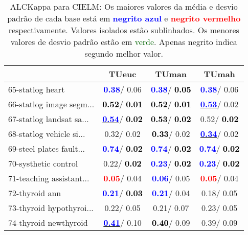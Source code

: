 \begin{table}[h]
\caption{ALCKappa para CIELM: Os maiores valores da média e desvio padrão de cada base está em \textcolor{blue}{\textbf{negrito azul}} e \textcolor{red}{\textbf{negrito vermelho}} respectivamente. Valores isolados estão sublinhados. Os menores valores de desvio padrão estão em \textcolor{darkgreen}{verde}. Apenas negrito indica segundo melhor valor.}
\begin{center}\begin{tabular}{lc|c|c}
 & TUeuc & TUman & TUmah\\ \hline 65-statlog heart & \textcolor{blue}{\textbf{  0.38}}/  0.06 & \textcolor{blue}{\textbf{  0.38}}/\textcolor{black}{\textbf{  0.05}} & \textcolor{blue}{\textbf{  0.38}}/  0.06 \\
66-statlog image segm... & \textcolor{black}{\textbf{  0.52}}/\textcolor{black}{\textbf{  0.01}} & \textcolor{black}{\textbf{  0.52}}/\textcolor{black}{\textbf{  0.01}} & \underline{\textcolor{blue}{\textbf{  0.53}}}/  0.02 \\
67-statlog landsat sa... & \underline{\textcolor{blue}{\textbf{  0.54}}}/\textcolor{black}{\textbf{  0.02}} & \textcolor{black}{\textbf{  0.53}}/\textcolor{black}{\textbf{  0.02}} &   0.52/\textcolor{black}{\textbf{  0.02}} \\
68-statlog vehicle si... &   0.32/  0.02 & \textcolor{black}{\textbf{  0.33}}/  0.02 & \underline{\textcolor{blue}{\textbf{  0.34}}}/  0.02 \\
69-steel plates fault... & \textcolor{blue}{\textbf{  0.74}}/\textcolor{black}{\textbf{  0.02}} & \textcolor{blue}{\textbf{  0.74}}/\textcolor{black}{\textbf{  0.02}} & \textcolor{blue}{\textbf{  0.74}}/\textcolor{black}{\textbf{  0.02}} \\
70-systhetic control &   0.22/\textcolor{black}{\textbf{  0.02}} & \textcolor{blue}{\textbf{  0.23}}/\textcolor{black}{\textbf{  0.02}} & \textcolor{blue}{\textbf{  0.23}}/\textcolor{black}{\textbf{  0.02}} \\
71-teaching assistant... & \textcolor{red}{\textbf{  0.05}}/  0.04 & \textcolor{blue}{\textbf{  0.06}}/  0.05 & \textcolor{red}{\textbf{  0.05}}/  0.04 \\ \hline
72-thyroid ann & \textcolor{blue}{\textbf{  0.21}}/\textcolor{black}{\textbf{  0.03}} & \textcolor{blue}{\textbf{  0.21}}/  0.04 &   0.18/  0.05 \\
73-thyroid hypothyroi... &   0.22/  0.05 &   0.21/  0.07 &   0.23/  0.05 \\
74-thyroid newthyroid & \underline{\textcolor{blue}{\textbf{  0.41}}}/  0.10 & \textcolor{black}{\textbf{  0.40}}/  0.09 &   0.39/  0.09 \\

\end{tabular}
\end{center}
\end{table}
